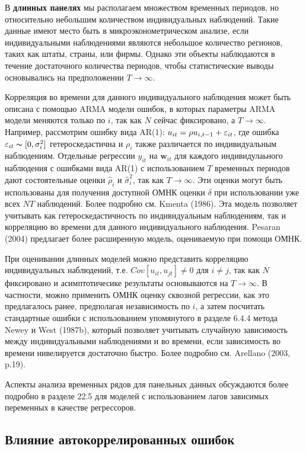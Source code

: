 В {\bf длинных панелях} мы располагаем множеством временных периодов, но относительно небольшим количеством индивидуальных наблюдений. Такие данные имеют место быть в микроэконометрическом анализе, если индивидуальными наблюдениями являются небольшое количество регионов, таких как штаты, страны, или фирмы. Однако эти объекты наблюдаются в течение достаточного количества периодов, чтобы статистические выводы основывались на предположении $T \rightarrow \infty$. 

Корреляция во времени для данного индивидуального наблюдения может быть описана с помощью ARMA  модели ошибок, в которых параметры ARMA модели меняются только по $i$, так как $N$ сейчас фиксировано, а  $T \rightarrow \infty$. Например, рассмотрим ошибку вида AR(1): $u_{it}=\rho u_{i,t-1}+\varepsilon_{it}$, где ошибка $\varepsilon_{it} \thicksim [0,\sigma^2_i]$ гетероскедастична и $\rho_i$ также различается по индивидуальным наблюдениям. Отдельные регрессии $y_{it}$ на $\mathbf w_{it}$
для каждого индивидулаьного наблюдения с ошибками вида AR(1) с использованием $T$ временных периодов дают состоятельные оценки $\hat \rho_i$ и $\hat \sigma^2_i$, так как  $T \rightarrow \infty$. Эти оценки могут быть использованы для получения доступной ОМНК оценки $\delta$ при использовании уже всех $NT$ наблюдений. Более подробно см. Kmenta (1986). Эта модель позволяет учитывать как гетероскедастичность по индивидуальным наблюдениям, так и корреляцию во времени для данного индивидуального наблюдения. Pesaran (2004) предлагает более расширенную модель, оцениваемую при помощи ОМНК.

При оценивании длинных моделей можно представить корреляцию индивидуальных наблюдений, т.е. $Cov[u_{it}, u_{jt}] \neq 0$ для $i \neq j$, так как $N$ фиксировано и асимптотичесике результаты основываются на $T \rightarrow \infty$. В частности, можно применить ОМНК оценку сквозной регрессии, как это предлагалось ранее, предполагая независимость по $i$, а затем посчитать стандартные ошибки с использованием упомянутого в разделе 6.4.4 метода Newey и West (1987b), который позволяет учитывать случайную зависимость между индивидуальными наблюдениями  и во времени, если зависимость во времени нивелируется достаточно быстро. Более подробно см. Arellano (2003, p.19). 

Аспекты анализа временных рядов для панельных данных обсуждаются более подробно в разделе 22.5 для моделей с использованием лагов зависимых переменных в качестве регрессоров.

\subsection{Влияние автокоррелированных ошибок}

